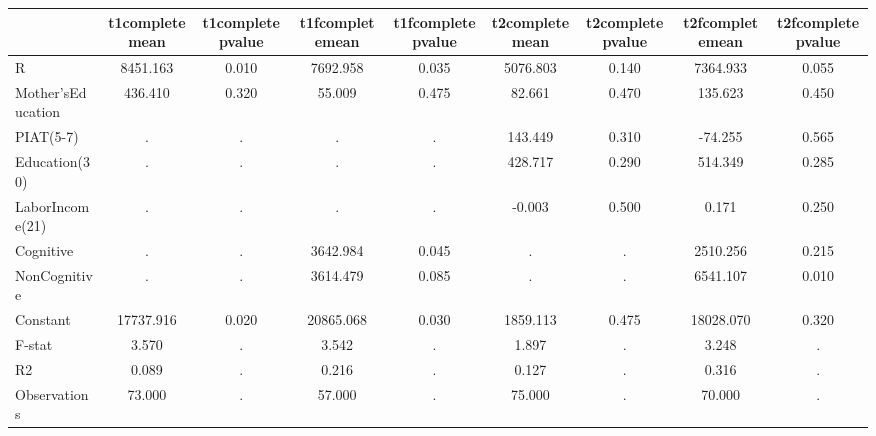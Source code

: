 \begin{table}[htbp]
\begin{tabular}{lcccccccc} \hline \hline
 & t1completemean  & t1completepvalue  & t1fcompletemean  & t1fcompletepvalue  & t2completemean  & t2completepvalue  & t2fcompletemean  & t2fcompletepvalue  \\  \hline 
R &  8451.163 &     0.010 &  7692.958 &     0.035 &  5076.803 &     0.140 &  7364.933 &     0.055 \\  
Mother'sEducation &   436.410 &     0.320 &    55.009 &     0.475 &    82.661 &     0.470 &   135.623 &     0.450 \\  
PIAT(5-7) &         . &         . &         . &         . &   143.449 &     0.310 &   -74.255 &     0.565 \\  
Education(30) &         . &         . &         . &         . &   428.717 &     0.290 &   514.349 &     0.285 \\  
LaborIncome(21) &         . &         . &         . &         . &    -0.003 &     0.500 &     0.171 &     0.250 \\  
Cognitive &         . &         . &  3642.984 &     0.045 &         . &         . &  2510.256 &     0.215 \\  
NonCognitive &         . &         . &  3614.479 &     0.085 &         . &         . &  6541.107 &     0.010 \\  
Constant & 17737.916 &     0.020 & 20865.068 &     0.030 &  1859.113 &     0.475 & 18028.070 &     0.320 \\  
F-stat &     3.570 &         . &     3.542 &         . &     1.897 &         . &     3.248 &         . \\  
R2 &     0.089 &         . &     0.216 &         . &     0.127 &         . &     0.316 &         . \\  
Observations &    73.000 &         . &    57.000 &         . &    75.000 &         . &    70.000 &         . \\  
\hline \hline \end{tabular}
\end{table}
